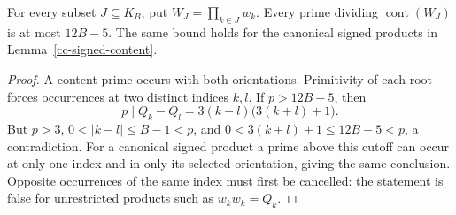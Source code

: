 \begin{lemma}
\label{cc-content-cutoff}
For every subset \(J\subseteq K_B\), put \(W_J=\prod_{k\in J}w_k\).
Every prime dividing \(\operatorname{cont}(W_J)\) is at most \(12B-5\).
The same bound holds for the canonical signed products in
Lemma~\ref{cc-signed-content}.
\end{lemma}
\begin{proof}
A content prime occurs with both orientations. Primitivity of each
root forces occurrences at two distinct indices \(k,l\). If
\(p>12B-5\), then
\[
 p\mid Q_k-Q_l=3(k-l)\bigl(3(k+l)+1\bigr).
\]
But \(p>3\), \(0<|k-l|\le B-1<p\), and
\(0<3(k+l)+1\le12B-5<p\), a contradiction.
For a canonical signed product a prime above this cutoff can occur
at only one index and in only its selected orientation, giving the
same conclusion. Opposite occurrences of the same index must first
be cancelled: the statement is false for unrestricted products such
as \(w_k\bar w_k=Q_k\).
\end{proof}

